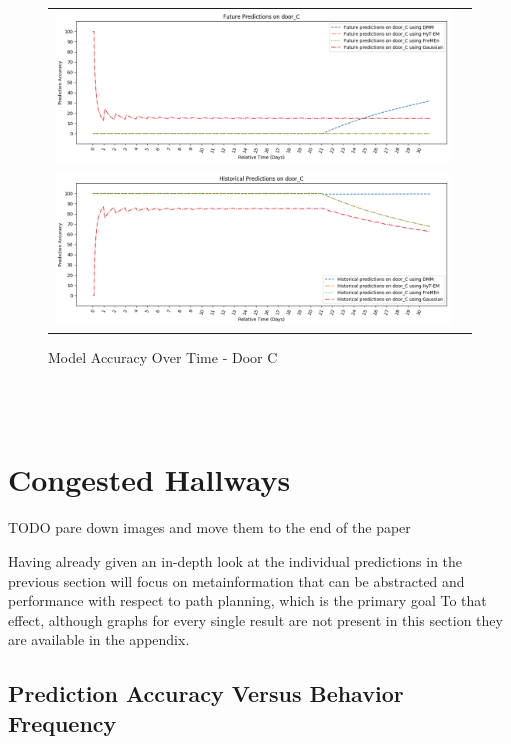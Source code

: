 \begin{center}
\begin{figure}[!Hp]
  \begin{tabular}{cc}
    {\includegraphics[width = 6in]{images/results/Future_Predictions_on_door_C.png}} \\
    {\includegraphics[width = 6in]{images/results/Historical_Predictions_on_door_C.png}} \\
  \end{tabular}
  \caption{Model Accuracy Over Time - Door C}
\end{figure}\\ \\
\end{center}


\section{ Congested Hallways }
TODO pare down images and move them to the end of the paper

Having already given an in-depth look at the individual predictions in the
previous section will
focus on metainformation that can be abstracted and
performance with respect to path planning, which is the primary goal
To that effect, although graphs for every single result are not
present in this section they are available in the appendix.

\subsection{ Prediction Accuracy Versus Behavior Frequency }

